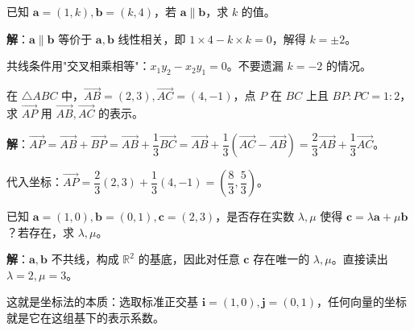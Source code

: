 \documentclass[12pt, a4paper]{ctexart}
\begin{document}
\vspace{6pt}

\begin{examplebox}[【例题3】线性相关条件]
已知 $\boldsymbol{a}=(1,k),\boldsymbol{b}=(k,4)$，若 $\boldsymbol{a}\parallel\boldsymbol{b}$，求 $k$ 的值。
\end{examplebox}

\noindent\textbf{解}：$\boldsymbol{a}\parallel\boldsymbol{b}$ 等价于 $\boldsymbol{a},\boldsymbol{b}$ 线性相关，即 $1\times4-k\times k=0$，解得 $k=\pm2$。

\begin{warnbox}[易错提醒]
共线条件用"交叉相乘相等"：$x_1y_2-x_2y_1=0$。不要遗漏 $k=-2$ 的情况。
\end{warnbox}

\vspace{6pt}

\begin{examplebox}[【例题4】正交分解的应用]
在 $\triangle ABC$ 中，$\overrightarrow{AB}=(2,3),\overrightarrow{AC}=(4,-1)$，点 $P$ 在 $BC$ 上且 $BP:PC=1:2$，求 $\overrightarrow{AP}$ 用 $\overrightarrow{AB},\overrightarrow{AC}$ 的表示。
\end{examplebox}

\noindent\textbf{解}：$\overrightarrow{AP}=\overrightarrow{AB}+\overrightarrow{BP}=\overrightarrow{AB}+\dfrac{1}{3}\overrightarrow{BC}=\overrightarrow{AB}+\dfrac{1}{3}(\overrightarrow{AC}-\overrightarrow{AB})=\dfrac{2}{3}\overrightarrow{AB}+\dfrac{1}{3}\overrightarrow{AC}$。

代入坐标：$\overrightarrow{AP}=\dfrac{2}{3}(2,3)+\dfrac{1}{3}(4,-1)=\left(\dfrac{8}{3},\dfrac{5}{3}\right)$。

\vspace{6pt}

\begin{examplebox}[【例题5】向量空间视角解存在性问题]
已知 $\boldsymbol{a}=(1,0),\boldsymbol{b}=(0,1),\boldsymbol{c}=(2,3)$，是否存在实数 $\lambda,\mu$ 使得 $\boldsymbol{c}=\lambda\boldsymbol{a}+\mu\boldsymbol{b}$？若存在，求 $\lambda,\mu$。
\end{examplebox}

\noindent\textbf{解}：$\boldsymbol{a},\boldsymbol{b}$ 不共线，构成 $\mathbb{R}^2$ 的基底，因此对任意 $\boldsymbol{c}$ 存在唯一的 $\lambda,\mu$。直接读出 $\lambda=2,\mu=3$。

\begin{tipbox}[高观点理解]
这就是坐标法的本质：选取标准正交基 $\boldsymbol{i}=(1,0),\boldsymbol{j}=(0,1)$，任何向量的坐标就是它在这组基下的表示系数。
\end{tipbox}
\end{document}
